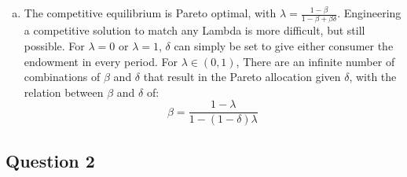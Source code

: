\documentclass{article}
\begin{document}
\begin{enumerate}[(a)]
	\item The competitive equilibrium is Pareto optimal, with ${\lambda = \frac{1-\beta}{1-\beta+\beta\delta}}$. Engineering a competitive solution to match any Lambda is more difficult, but still possible. For ${\lambda=0}$ or ${\lambda=1}$, $\delta$ can simply be set to give either consumer the endowment in every period. For ${\lambda\in(0,1)}$, There are an infinite number of combinations of $\beta$ and $\delta$ that result in the Pareto allocation given $\delta$, with the relation between $\beta$ and $\delta$ of:
	\[
		\beta = \frac{1-\lambda}{1-(1-\delta)\lambda}
	\]
	
	
\end{enumerate}

\pagebreak
\subsection*{Question 2}
\end{document}

